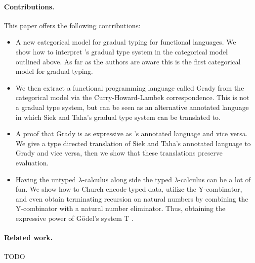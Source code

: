 \paragraph{Contributions.} This paper offers the following contributions:
\begin{itemize}

\item A new categorical model for gradual typing for functional
  languages.  We show how to interpret \cite{Siek:2006}'s gradual type
  system in the categorical model outlined above.  As far as the
  authors are aware this is the first categorical model for gradual
  typing.

\item We then extract a functional programming language called Grady
  from the categorical model via the Curry-Howard-Lambek
  correspondence.  This is not a gradual type system, but can be seen
  as an alternative annotated language in which Siek and Taha's
  gradual type system can be translated to.
  
\item A proof that Grady is as expressive as \cite{Siek:2006}'s
  annotated language and vice versa. We give a type directed
  translation of Siek and Taha's annotated language to Grady and vice
  versa, then we show that these translations preserve evaluation.

\item Having the untyped $\lambda$-calculus along side the typed
  $\lambda$-calculus can be a lot of fun.  We show how to Church
  encode typed data, utilize the Y-combinator, and even obtain
  terminating recursion on natural numbers by combining the
  Y-combinator with a natural number eliminator.  Thus, obtaining the
  expressive power of G\"odel's system T \cite{Girard:1989}.
\end{itemize}

\paragraph{Related work.} TODO


